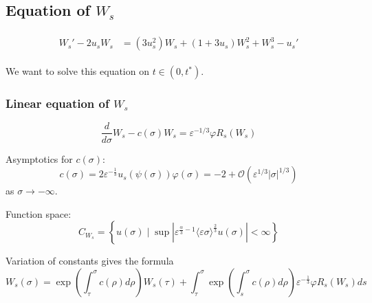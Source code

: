 \documentclass[letterpaper,11pt]{article}
\newcommand{\rmO}{\mathcal{O}}
\newcommand{\eps}{\varepsilon}
\numberwithin{equation}{section}
\theoremstyle{plain}
\begin{document}
\subsection{Equation of \texorpdfstring{$W_{s}$}{Ws} }
\begin{align}
\begin{split}
W_{s}' -2u_sW_s &=   (3u_s^2)W_s + (1+3u_s)W_s^2 + W_s^3 - u_s'
\end{split}
\end{align}

We want to solve this equation on $t\in (0, t^*)$.
\subsubsection{Linear equation of \texorpdfstring{$W_{s}$}{Ws}}
\begin{equation}
\frac{d}{d\sigma} W_s - c(\sigma)W_s = \eps^{-1/3}\varphi R_s(W_s)
\end{equation}

Asymptotics for $c(\sigma)$:
\[
c(\sigma) = 2\eps^{-\frac{1}{3}}u_s(\psi(\sigma))\varphi(\sigma) = -2 + \rmO(\eps^{1/3}|\sigma|^{1/3})
\]
as $\sigma \to -\infty$.

Function space:
\[
C_{W_s} = \left\{ u(\sigma) \mid \sup |\eps^{\frac{\alpha}{3} -1 }\langle \eps\sigma \rangle^{\frac{2}{3}} u(\sigma)|<\infty \right\}
\]



Variation of constants gives the formula
\begin{equation}\label{solution2}
W_s(\sigma) = \exp\left(\int_\tau^\sigma c(\rho)d\rho\right)W_s(\tau) + \int_\tau^\sigma \exp\left(\int_s^\sigma c(\rho)d\rho\right)\eps^{-\frac{1}{3}}\varphi R_s(W_s)	 ds
\end{equation}
\end{document}

